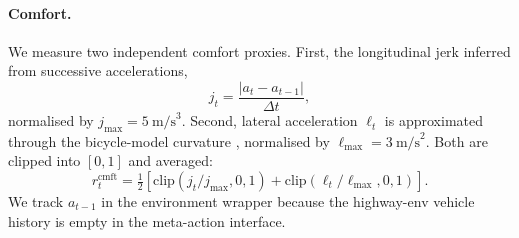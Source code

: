 \documentclass[12pt, letterpaper]{article}
\begin{document}
\paragraph{Comfort.}
We measure two independent comfort proxies. First, the longitudinal jerk inferred from successive accelerations,
\begin{equation}
    j_t = \frac{|a_t - a_{t-1}|}{\Delta t},
\end{equation}
normalised by $j_{\max}=5~\text{m/s}^3$. Second, lateral acceleration $\ell_t$ is approximated through the bicycle-model curvature \cite{rajamani2011vehicle}, normalised by $\ell_{\max}=3~\text{m/s}^2$. Both are clipped into $[0, 1]$ and averaged:
\begin{equation}
    r_t^{\text{cmft}} = \tfrac{1}{2}\!\left[\mathrm{clip}(j_t / j_{\max}, 0, 1) + \mathrm{clip}(\ell_t / \ell_{\max}, 0, 1)\right].
\end{equation}
We track $a_{t-1}$ in the environment wrapper because the highway-env vehicle history is empty in the meta-action interface.
\end{document}
